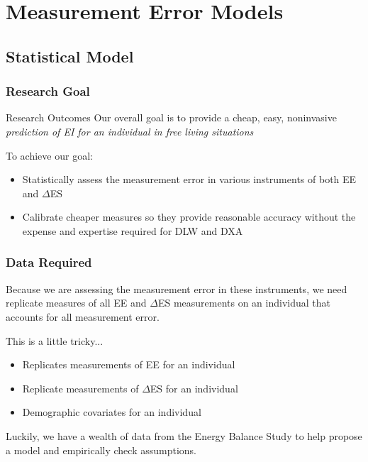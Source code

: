 \documentclass[handout]{beamer}\usepackage[]{graphicx}\usepackage[]{color}
\begin{document}


\section{Measurement Error Models}
\subsection{Statistical Model}

\begin{frame}
\frametitle{Research Goal}

\begin{block}{Research Outcomes}
Our overall goal is to provide a cheap, easy, noninvasive \emph{prediction of EI for an individual in free living situations}
\end{block}

To achieve our goal:

\begin{itemize}
\item
Statistically assess the measurement error in various instruments of both EE and $\Delta$ES
\item 
Calibrate cheaper measures so they provide reasonable accuracy without the expense and expertise required for DLW and DXA
\end{itemize}

\end{frame}

\begin{frame}
\frametitle{Data Required}

Because we are assessing the measurement error in these instruments, we need replicate measures of all EE and $\Delta$ES measurements on an individual that accounts for all measurement error.

This is a little tricky...
\begin{itemize}
\item
Replicates measurements of EE for an individual
\item
Replicate measurements of $\Delta$ES for an individual
\item
Demographic covariates for an individual
\end{itemize}

Luckily, we have a wealth of data from the Energy Balance Study to help propose a model and empirically check assumptions.

\end{frame}
\end{document}
